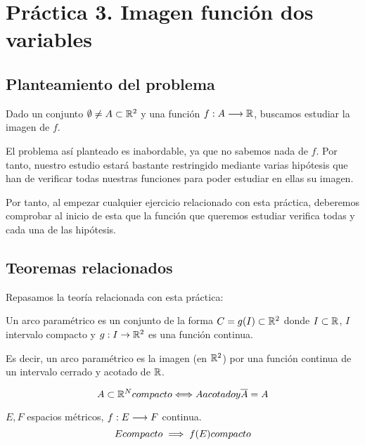 \chapter{Práctica 3. Imagen función dos variables}

\section{Planteamiento del problema}
\noindent
Dado un conjunto $\emptyset \neq A \subset \mathbb R^2$ y una función $f:A \longrightarrow \mathbb R$, buscamos estudiar la imagen de $f$.
\vspace{.5cm}

\noindent
El problema así planteado es inabordable, ya que no sabemos nada de $f$. Por tanto, nuestro estudio estará bastante restringido mediante varias hipótesis que han de verificar todas nuestras funciones para poder estudiar en ellas su imagen.
\vspace{.5cm}

\noindent
Por tanto, al empezar cualquier ejercicio relacionado con esta práctica, deberemos comprobar al inicio de esta que la función que queremos estudiar verifica todas y cada una de las hipótesis.

\section{Teoremas relacionados}
\noindent
Repasamos la teoría relacionada con esta práctica:

\begin{definicion}
    Un arco paramétrico es un conjunto de la forma $C=g(I) \subset \mathbb R^2$ donde $I \subset \mathbb R$, $I$ intervalo compacto y $g:I\rightarrow \mathbb R^2$ es una función continua.
    \vspace{.5cm}

    \noindent
    Es decir, un arco paramétrico es la imagen (en $\mathbb R^2$) por una función continua de un intervalo cerrado y acotado de $\mathbb R$.
\end{definicion}

\begin{prop}
    $$A \subset \mathbb R^N \\ compacto \Longleftrightarrow A \\ acotado \\ y \\ \overline{A} = A$$
\end{prop}

\begin{teo}[Weierstrass]
    $E,F$ espacios métricos, $f:E \longrightarrow F$ continua.
    $$E \\ compacto \implies f(E) \\ compacto$$
\end{teo}

